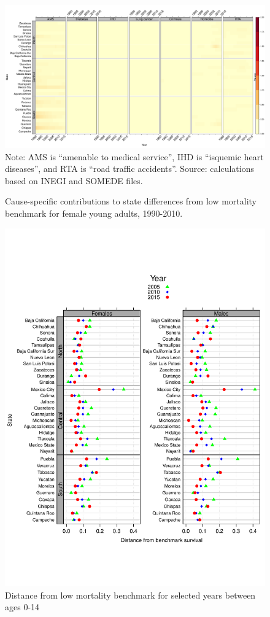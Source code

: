 \documentclass[11.5pt]{article}
\begin{document}
{\begin{figure}
\centering
\caption{Cause-specific contributions to state differences from low mortality benchmark for female young adults, 1990-2010.}
\label{fig:e15_39_females}
\includegraphics[scale=.3]{YoungAdult_Female_heatmap.pdf}
Note: AMS is ``amenable to medical service'', IHD is ``isquemic heart diseases'', and RTA is ``road traffic accidents''. Source: calculations based on INEGI and SOMEDE files.
\end{figure}


\begin{figure}
\centering
\caption{Distance from low mortality benchmark for selected years between ages 0-14}
\begin{center}
\includegraphics[scale=.5]{Distance_y.pdf}
\end{center}


\end{figure}}
\end{document}
